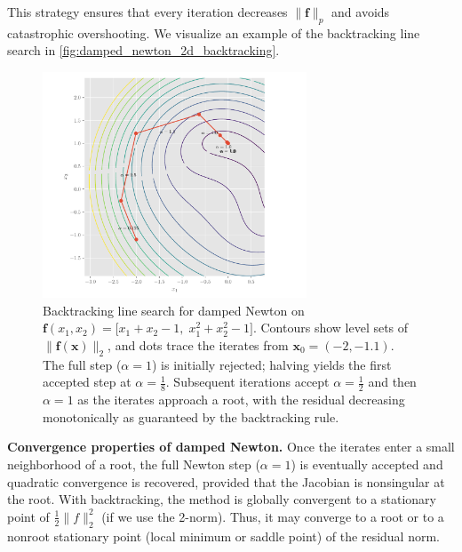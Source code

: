 This strategy ensures that every iteration decreases \(\lVert \mathbf{f}\rVert_p\) and avoids catastrophic overshooting. We visualize an example of the backtracking line search in \autoref{fig:damped_newton_2d_backtracking}.

\begin{figure}[h]
\centering
\includegraphics[width=0.7\textwidth]{figs/nle/damped_newton_2d_backtracking.pdf}
\caption{Backtracking line search for damped Newton on \(\mathbf{f}(x_1,x_2)=\big[x_1+x_2-1,\;x_1^2+x_2^2-1\big]\). Contours show level sets of \(\|\mathbf{f}(\mathbf{x})\|_2\), and dots trace the iterates from \(\mathbf{x}_0=(-2,-1.1)\). The full step (\(\alpha=1\)) is initially rejected; halving yields the first accepted step at \(\alpha=\tfrac{1}{8}\). Subsequent iterations accept \(\alpha=\tfrac12\) and then \(\alpha=1\) as the iterates approach a root, with the residual decreasing monotonically as guaranteed by the backtracking rule.}
\label{fig:damped_newton_2d_backtracking}
\end{figure}


\textbf{Convergence properties of damped Newton.}
Once the iterates enter a small neighborhood of a root, the full Newton step ($\alpha=1$) is eventually accepted and quadratic convergence is recovered, provided that the Jacobian is nonsingular at the root. With backtracking, the method is globally convergent to a stationary point of $\tfrac12\|f\|_2^2$ (if we use the 2-norm). Thus, it may converge to a root or to a nonroot stationary point (local minimum or saddle point) of the residual norm.

